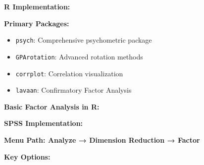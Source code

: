 \documentclass[
]{article}
\begin{document}
\textbf{R Implementation:}

\textbf{Primary Packages:}

\begin{itemize}
\item
  \texttt{psych}: Comprehensive psychometric package
\item
  \texttt{GPArotation}: Advanced rotation methods
\item
  \texttt{corrplot}: Correlation visualization
\item
  \texttt{lavaan}: Confirmatory Factor Analysis
\end{itemize}

\textbf{Basic Factor Analysis in R:}

\begin{Shaded}
\begin{Highlighting}[]

\OtherTok{\textless{}{-}} \NormalTok{(}\NormalTok{)}

\NormalTok{(} 

 \NormalTok{)}
 \NormalTok{)}

\OtherTok{\textless{}{-}}  \NormalTok{, } \NormalTok{, } \NormalTok{)}

 \NormalTok{, } \NormalTok{)}
\end{Highlighting}
\end{Shaded}

\textbf{SPSS Implementation:}

\textbf{Menu Path: Analyze → Dimension Reduction → Factor}

\textbf{Key Options:}
\end{document}
